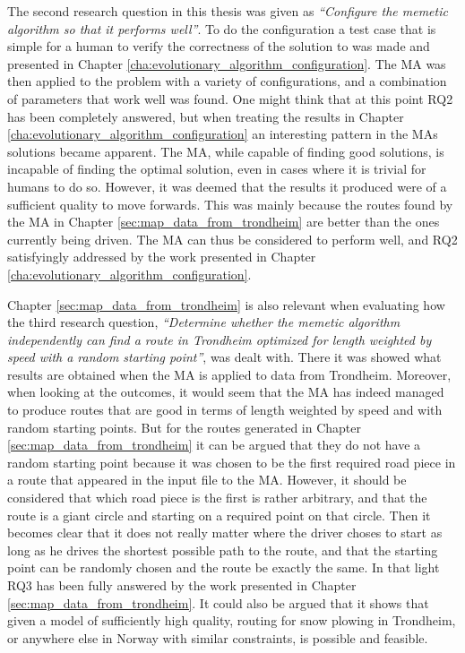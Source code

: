 The second research question in this thesis was given as \emph{\enquote{Configure the memetic algorithm so that it performs well}}. To do the configuration a test case that is simple for a human to verify the correctness of the solution to was made and presented in Chapter \ref{cha:evolutionary_algorithm_configuration}. The MA was then applied to the problem with a variety of configurations, and a combination of parameters that work well was found. One might think that at this point RQ2 has been completely answered, but when treating the results in Chapter \ref{cha:evolutionary_algorithm_configuration} an interesting pattern in the MAs solutions became apparent. The MA, while capable of finding good solutions, is incapable of finding the optimal solution, even in cases where it is trivial for humans to do so. However, it was deemed that the results it produced were of a sufficient quality to move forwards. This was mainly because the routes found by the MA in Chapter \ref{sec:map_data_from_trondheim} are better than the ones currently being driven. The MA can thus be considered to perform well, and RQ2 satisfyingly addressed by the work presented in Chapter \ref{cha:evolutionary_algorithm_configuration}.

Chapter \ref{sec:map_data_from_trondheim} is also relevant when evaluating how the third research question, \emph{\enquote{Determine whether the memetic algorithm independently can find a route in Trondheim optimized for length weighted by speed with a random starting point}}, was dealt with. There it was showed what results are obtained when the MA is applied to data from Trondheim. Moreover, when looking at the outcomes, it would seem that the MA has indeed managed to produce routes that are good in terms of length weighted by speed and with random starting points. But for the routes generated in Chapter \ref{sec:map_data_from_trondheim} it can be argued that they do not have a random starting point because it was chosen to be the first required road piece in a route that appeared in the input file to the MA. However, it should be considered that which road piece is the first is rather arbitrary, and that the route is a giant circle and starting on a required point on that circle. Then it becomes clear that it does not really matter where the driver choses to start as long as he drives the shortest possible path to the route, and that the starting point can be randomly chosen and the route be exactly the same. In that light RQ3 has been fully answered by the work presented in Chapter \ref{sec:map_data_from_trondheim}. It could also be argued that it shows that given a model of sufficiently high quality, routing for snow plowing in Trondheim, or anywhere else in Norway with similar constraints, is possible and feasible.

